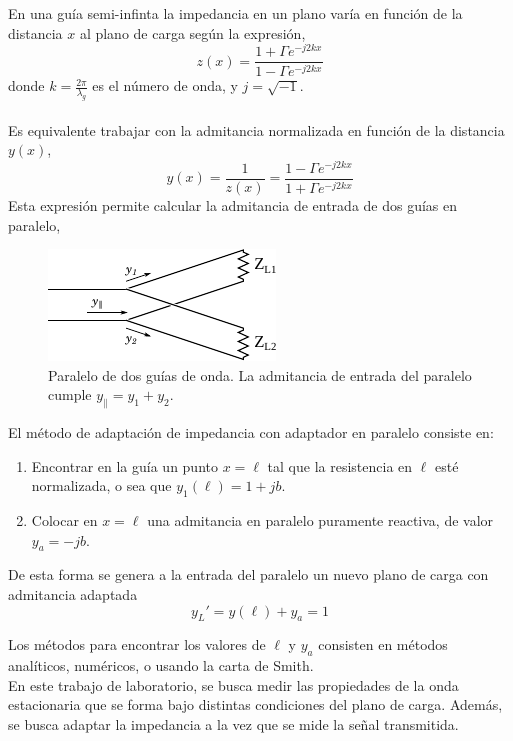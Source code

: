 \documentclass[11pt,a4paper]{article}
\begin{document}
\begin{multicols}{2}
En una guía semi-infinta la impedancia en un plano varía en función de la distancia $x$ al plano de carga según la expresión,
\begin{equation}
    z(x) = \frac{1 + \Gamma e^{-j2kx}}{1 - \Gamma e^{-j2kx}}
\end{equation}
donde $k=\frac{2\pi}{\lambda_g}$ es el número de onda, y $j=\sqrt{-1}$. \\ \\
Es equivalente trabajar con la admitancia normalizada en función de la distancia $y(x)$,
\begin{equation}
    y(x) = \frac{1}{z(x)} = \frac{1 - \Gamma e^{-j2kx}}{1 + \Gamma e^{-j2kx}}
\end{equation}
Esta expresión permite calcular la admitancia de entrada de dos guías en paralelo,
\begin{figure}[H]
    \centering
    \includegraphics[width=0.7\linewidth]{Images/guiapll.pdf}
    \caption{Paralelo de dos guías de onda. La admitancia de entrada del paralelo cumple $y_\parallel = y_1+y_2$.}
    \label{fig:pll}
\end{figure}

El método de adaptación de impedancia con adaptador en paralelo consiste en:
\begin{enumerate}
    \item Encontrar en la guía un punto $x = \ell$ tal que la resistencia en $\ell$ esté normalizada, o sea que $y_1(\ell)=1+jb$.
    \item Colocar en $x=\ell$ una admitancia en paralelo puramente reactiva, de valor $y_a = -jb$.
\end{enumerate}

De esta forma se genera a la entrada del paralelo un nuevo plano de carga con admitancia adaptada 
$$y_L' = y(\ell) + y_a = 1$$

Los métodos para encontrar los valores de $\ell$ y $y_a$ consisten en métodos analíticos, numéricos, o usando la carta de Smith.\\

En este trabajo de laboratorio, se busca medir las propiedades de la onda estacionaria que se forma bajo distintas condiciones del plano de carga. Además, se busca adaptar la impedancia a la vez que se mide la señal transmitida. 


\end{multicols}
\end{document}
